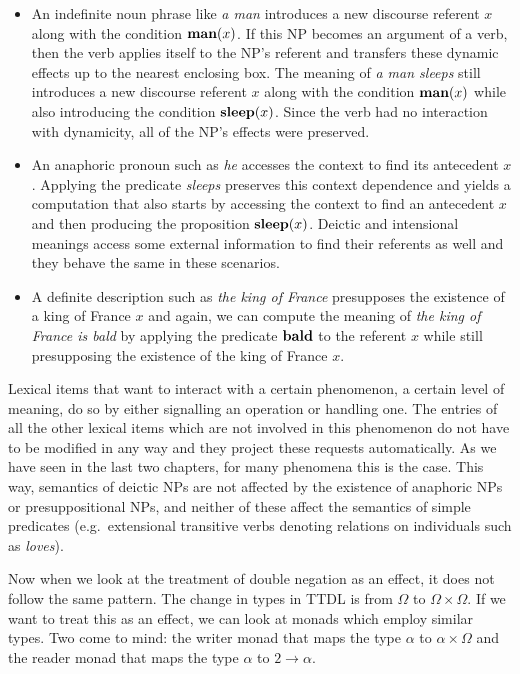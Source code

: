 \begin{itemize}
\item An indefinite noun phrase like \emph{a man} introduces a new
  discourse referent $x$ along with the condition $\textbf{man}(x)$. If this
  NP becomes an argument of a verb, then the verb applies itself to the
  NP's referent and transfers these dynamic effects up to the nearest
  enclosing box. The meaning of \emph{a man sleeps} still introduces a new
  discourse referent $x$ along with the condition $\textbf{man}(x)$ while also
  introducing the condition $\textbf{sleep}(x)$. Since the verb had no
  interaction with dynamicity, all of the NP's effects were preserved.
\item An anaphoric pronoun such as \emph{he} accesses the context to find
  its antecedent $x$. Applying the predicate \emph{sleeps} preserves this
  context dependence and yields a computation that also starts by accessing
  the context to find an antecedent $x$ and then producing the proposition
  $\textbf{sleep}(x)$. Deictic and intensional meanings access some external
  information to find their referents as well and they behave the same in
  these scenarios.
\item A definite description such as \emph{the king of France} presupposes
  the existence of a king of France $x$ and again, we can compute the
  meaning of \emph{the king of France is bald} by applying the predicate
  $\textbf{bald}$ to the referent $x$ while still presupposing the existence
  of the king of France $x$.
\end{itemize}

Lexical items that want to interact with a certain phenomenon, a certain
level of meaning, do so by either signalling an operation or handling
one. The entries of all the other lexical items which are not involved in
this phenomenon do not have to be modified in any way and they project
these requests automatically. As we have seen in the last two chapters, for
many phenomena this is the case. This way, semantics of deictic NPs are not
affected by the existence of anaphoric NPs or presuppositional NPs, and
neither of these affect the semantics of simple predicates (e.g.\
extensional transitive verbs denoting relations on individuals such as
\emph{loves}).

Now when we look at the treatment of double negation as an effect, it does
not follow the same pattern. The change in types in TTDL is from $\Omega$
to $\Omega \times \Omega$. If we want to treat this as an effect, we can
look at monads which employ similar types. Two come to mind: the writer
monad that maps the type $\alpha$ to $\alpha \times \Omega$ and the reader
monad that maps the type $\alpha$ to $2 \to \alpha$.


